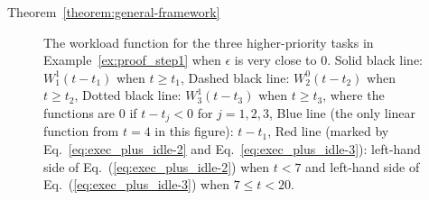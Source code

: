 \begin{appProof}{Theorem~\ref{theorem:general-framework}}
\begin{figure}[t]
  \caption{\small The workload function for the three higher-priority tasks in Example~\ref{ex:proof_step1} when $\epsilon$ is very close to $0$. Solid black line: $W_1^1(t-t_1)$ when $t \geq t_1$, Dashed black line: $W_2^0(t-t_2)$ when $t \geq t_2$, Dotted black line: $W_3^1(t-t_3)$ when $t \geq t_3$, where the functions are $0$ if $t-t_j < 0$ for $j=1,2,3$, Blue line (the only linear function from $t=4$ in this figure): $t-t_1$, Red line (marked by Eq.~\eqref{eq:exec_plus_idle-2} and Eq.~\eqref{eq:exec_plus_idle-3}): left-hand side of Eq.~(\ref{eq:exec_plus_idle-2}) when $t < 7$ and left-hand side of Eq.~(\ref{eq:exec_plus_idle-3}) when $ 7 \leq t < 20$.}
  \label{fig:example-step2}
\end{figure}




		
		
		

		


\end{appProof}
